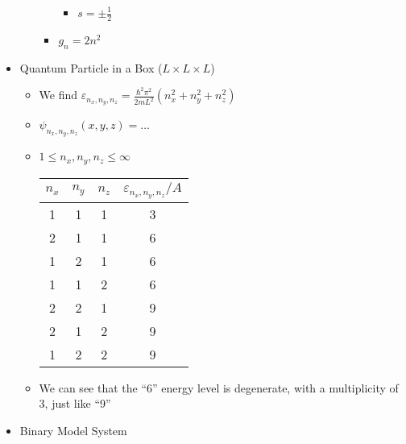 \begin{itemize}
\begin{itemize}
\begin{itemize}
\begin{itemize}
              \item $s=\pm\frac{1}{2}$

            \end{itemize}

          \item $g_n=2n^2$

        \end{itemize}

    \end{itemize}

  \item Quantum Particle in a Box ($L\times L\times L$)

    \begin{itemize}

      \item We find $\varepsilon_{n_x,n_y,n_z}=\frac{\hbar^2\pi^2}{2mL^2}(n_x^2+n_y^2+n_z^2)$

      \item $\psi_{n_x,n_y,n_z}(x,y,z)=\ldots$

      \item $1\leq n_x,n_y,n_z\leq \infty$

        \begin{center}
          \begin{tabular}[h]{c | c | c | c}
            $n_x$ & $n_y$ & $n_z$ & $\varepsilon_{n_x,n_y,n_z}/A$\\
            \hline
            1 & 1 & 1 & 3\\
            \hline
            2 & 1 & 1 & 6\\
            1 & 2 & 1 & 6\\
            1 & 1 & 2 & 6\\
            \hline
            2 & 2 & 1 & 9\\
            2 & 1 & 2 & 9\\
            1 & 2 & 2 & 9\\
            \hline
          \end{tabular}
        \end{center}

      \item We can see that the ``6'' energy level is degenerate, with a multiplicity of $3$, just like ``9''

    \end{itemize}

  \item Binary Model System

    \begin{itemize}


\end{itemize}
\end{itemize}
